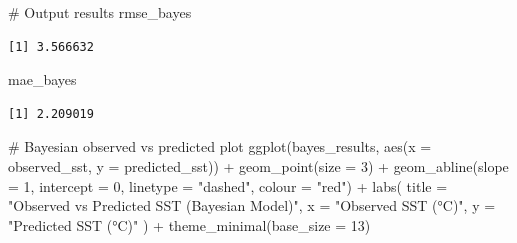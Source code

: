 \documentclass[
  11pt,
]{article}
\newenvironment{Shaded}{\begin{snugshade}}{\end{snugshade}}
\newcommand{\AttributeTok}[1]{\textcolor[rgb]{0.40,0.45,0.13}{#1}}
\newcommand{\CommentTok}[1]{\textcolor[rgb]{0.37,0.37,0.37}{#1}}
\newcommand{\DecValTok}[1]{\textcolor[rgb]{0.68,0.00,0.00}{#1}}
\newcommand{\FunctionTok}[1]{\textcolor[rgb]{0.28,0.35,0.67}{#1}}
\newcommand{\NormalTok}[1]{\textcolor[rgb]{0.00,0.23,0.31}{#1}}
\newcommand{\SpecialCharTok}[1]{\textcolor[rgb]{0.37,0.37,0.37}{#1}}
\newcommand{\StringTok}[1]{\textcolor[rgb]{0.13,0.47,0.30}{#1}}
\begin{document}
\begin{Shaded}
\begin{Highlighting}[]
\CommentTok{\# Output results}
\NormalTok{rmse\_bayes}
\end{Highlighting}
\end{Shaded}

\begin{verbatim}
[1] 3.566632
\end{verbatim}

\begin{Shaded}
\begin{Highlighting}[]
\NormalTok{mae\_bayes}
\end{Highlighting}
\end{Shaded}

\begin{verbatim}
[1] 2.209019
\end{verbatim}

\begin{Shaded}
\begin{Highlighting}[]
\CommentTok{\# Bayesian observed vs predicted plot}
\FunctionTok{ggplot}\NormalTok{(bayes\_results, }\FunctionTok{aes}\NormalTok{(}\AttributeTok{x =}\NormalTok{ observed\_sst, }\AttributeTok{y =}\NormalTok{ predicted\_sst)) }\SpecialCharTok{+}
  \FunctionTok{geom\_point}\NormalTok{(}\AttributeTok{size =} \DecValTok{3}\NormalTok{) }\SpecialCharTok{+}
  \FunctionTok{geom\_abline}\NormalTok{(}\AttributeTok{slope =} \DecValTok{1}\NormalTok{, }\AttributeTok{intercept =} \DecValTok{0}\NormalTok{, }\AttributeTok{linetype =} \StringTok{"dashed"}\NormalTok{, }\AttributeTok{colour =} \StringTok{"red"}\NormalTok{) }\SpecialCharTok{+}
  \FunctionTok{labs}\NormalTok{(}
    \AttributeTok{title =} \StringTok{"Observed vs Predicted SST (Bayesian Model)"}\NormalTok{,}
    \AttributeTok{x =} \StringTok{"Observed SST (°C)"}\NormalTok{,}
    \AttributeTok{y =} \StringTok{"Predicted SST (°C)"}
\NormalTok{  ) }\SpecialCharTok{+}
  \FunctionTok{theme\_minimal}\NormalTok{(}\AttributeTok{base\_size =} \DecValTok{13}\NormalTok{)}
\end{Highlighting}
\end{Shaded}
\end{document}
